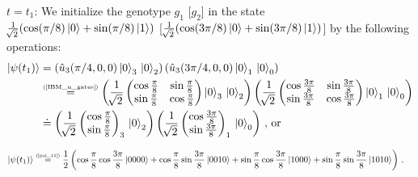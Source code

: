 \documentclass[11pt]{article}
\numberwithin{equation}{section} %
\numberwithin{figure}{section} %
\newcommand\numeq[1] %
  {\stackrel{\scriptscriptstyle(\mkern-1.5mu#1\mkern-1.5mu)}{=}}
\begin{document}
$t=t_1$: We initialize the genotype $g_1$ [$g_2$] in the state $\frac{1}{\sqrt[]{2}}(\cos(\pi/8)\ket{0}+\sin(\pi/8)\ket{1})$ [$\frac{1}{\sqrt[]{2}}(\cos(3\pi/8)\ket{0}+\sin(3\pi/8)\ket{1})$] by the following operations: $\,$ \cite[p.~3, l.~5]{QAL_IBM} 
\begin{equation} \label{psi_t1}
\begin{split}
\ket{\psi(t_1)}
&	= \left(\hat{u}_3(\pi/4,0,0)\ket{0}_3\,\ket{0}_2\right) \left(\hat{u}_3(3\pi/4,0,0)\ket{0}_1\,\ket{0}_0\right) \\
&	\numeq{\textrm{\ref{IBM_u_gates}}}\left(\frac{1}{\sqrt[]{2}}\begin{pmatrix} \cos\frac{\pi}{8}&\sin\frac{\pi}{8}\\ \sin\frac{\pi}{8}&\cos\frac{\pi}{8} \end{pmatrix}\ket{0}_3\,\ket{0}_2\right) \left(\frac{1}{\sqrt[]{2}}\begin{pmatrix} \cos\frac{3\pi}{8}&\sin\frac{3\pi}{8}\\ \sin\frac{3\pi}{8}&\cos\frac{3\pi}{8} \end{pmatrix}\ket{0}_1\,\ket{0}_0\right)\\
&	\doteq \left(\frac{1}{\sqrt[]{2}}\begin{pmatrix} \cos\frac{\pi}{8}\\ \sin\frac{\pi}{8}\end{pmatrix}_3\,\ket{0}_2\right) \left(\frac{1}{\sqrt[]{2}}\begin{pmatrix} \cos\frac{3\pi}{8}\\ \sin\frac{3\pi}{8}\end{pmatrix}_1\,\ket{0}_0\right)\,\textrm{, or}
\end{split}
\end{equation}

\begin{equation} \label{psi_t1_2}
\begin{split}
\ket{\psi(t_1)}
&	\numeq{\textrm{\ref{psi_t1}}} \frac{1}{2}\left( \cos\frac{\pi}{8}\cos\frac{3\pi}{8}\ket{0000} + \cos\frac{\pi}{8}\sin\frac{3\pi}{8}\ket{0010} + \sin\frac{\pi}{8}\cos\frac{3\pi}{8}\ket{1000} + \sin\frac{\pi}{8}\sin\frac{3\pi}{8}\ket{1010}\right)\,\textrm{.}
\end{split}
\end{equation}
\end{document}
